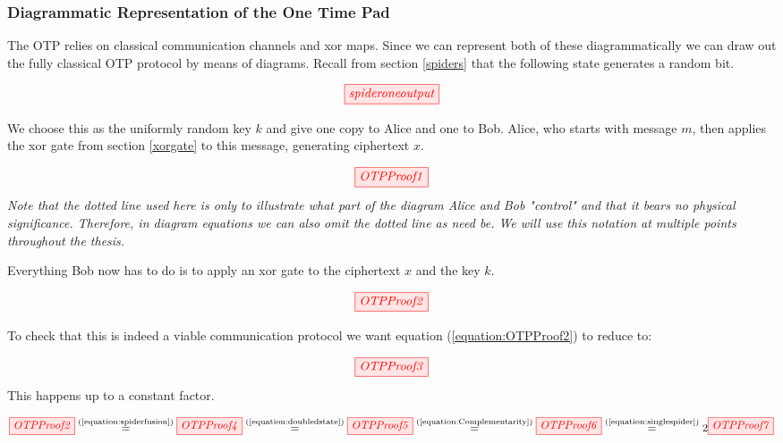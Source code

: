 \documentclass[]{article}
\newcommand{\equaltext}[1]{\ensuremath{\stackrel{\text{#1}}{=}}}
\begin{document}
\subsubsection{Diagrammatic Representation of the One Time Pad}

The OTP relies on classical communication channels and xor maps. Since we can represent both of these diagrammatically we can draw out the fully classical OTP protocol by means of diagrams. Recall from section \ref{spiders} that the following state generates a random bit.

\begin{equation}
	\tikzfig{spideroneoutput}
\end{equation}

We choose this as the uniformly random key $k$ and give one copy to Alice and one to Bob. Alice, who starts with message $m$, then applies the xor gate from section \ref{xorgate} to this message, generating ciphertext $x$.

\begin{equation}
	\tikzfig{OTPProof1}
\end{equation}
\textit{Note that the dotted line used here is only to illustrate what part of the diagram Alice and Bob "control" and that it bears no physical significance. Therefore, in diagram equations we can also omit the dotted line as need be. We will use this notation at multiple points throughout the thesis.}


Everything Bob now has to do is to apply an xor gate to the ciphertext $x$ and the key $k$.

\begin{equation}
\label{equation:OTPProof2}
\tikzfig{OTPProof2}
\end{equation}

To check that this is indeed a viable communication protocol we want equation (\ref{equation:OTPProof2}) to reduce to:

\begin{equation}
\label{equation:OTPProof3}
\tikzfig{OTPProof3}
\end{equation}
\newpage
This happens up to a constant factor.

\begin{equation}
\label{equation:OTPProoflong}
\tikzfig{OTPProof2}\equaltext{(\ref{equation:spiderfusion})} \tikzfig{OTPProof4} \equaltext{(\ref{equation:doubledstate})} \tikzfig{OTPProof5} \equaltext{(\ref{equation:Complementarity})} \tikzfig{OTPProof6} \equaltext{(\ref{equation:singlespider})} 2 \tikzfig{OTPProof7}
\end{equation}
\end{document}

